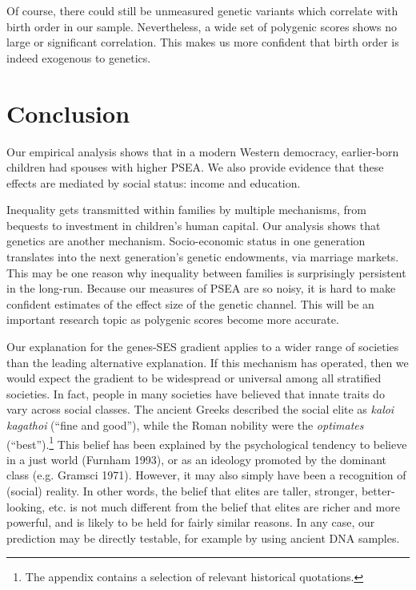 \documentclass[
]{article}
\begin{document}
Of course, there could still be unmeasured genetic variants which
correlate with birth order in our sample. Nevertheless, a wide set of
polygenic scores shows no large or significant correlation. This makes
us more confident that birth order is indeed exogenous to genetics.

\hypertarget{conclusion}{%
\section{Conclusion}\label{conclusion}}

Our empirical analysis shows that in a modern Western democracy,
earlier-born children had spouses with higher PSEA. We also provide
evidence that these effects are mediated by social status: income and
education.

Inequality gets transmitted within families by multiple mechanisms, from
bequests to investment in children's human capital. Our analysis shows
that genetics are another mechanism. Socio-economic status in one
generation translates into the next generation's genetic endowments, via
marriage markets. This may be one reason why inequality between families
is surprisingly persistent in the long-run. Because our measures of PSEA
are so noisy, it is hard to make confident estimates of the effect size
of the genetic channel. This will be an important research topic as
polygenic scores become more accurate.

Our explanation for the genes-SES gradient applies to a wider range of
societies than the leading alternative explanation. If this mechanism
has operated, then we would expect the gradient to be widespread or
universal among all stratified societies. In fact, people in many
societies have believed that innate traits do vary across social
classes. The ancient Greeks described the social elite as \emph{kaloi
kagathoi} (``fine and good''), while the Roman nobility were the
\emph{optimates} (``best'').\footnote{The appendix contains a selection of relevant historical
  quotations.} This belief has been explained by the
psychological tendency to believe in a just world (Furnham 1993), or
as an ideology promoted by the dominant class (e.g. Gramsci 1971). However, it may also simply have been a
recognition of (social) reality. In other words, the belief that elites
are taller, stronger, better-looking, etc. is not much different from
the belief that elites are richer and more powerful, and is likely to be
held for fairly similar reasons. In any case, our prediction may be
directly testable, for example by using ancient DNA samples.
\end{document}
